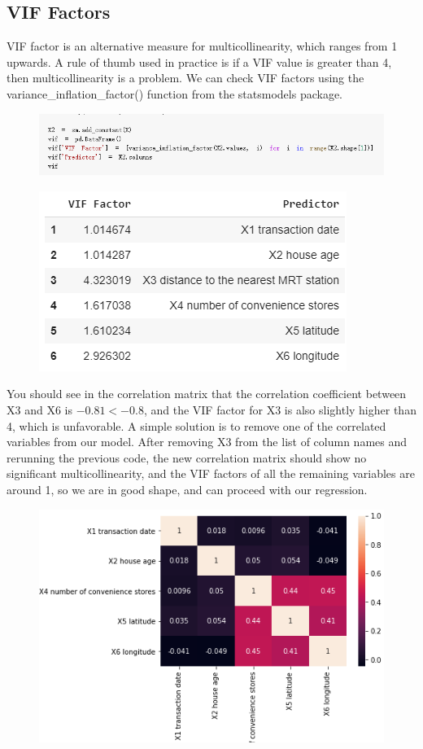 \documentclass{article}
\begin{document}
\subsection*{VIF Factors}
VIF factor is an alternative measure for multicollinearity, which ranges from 1 upwards. A rule of thumb used in practice is if a VIF value is greater than 4, then multicollinearity is a problem. We can check VIF factors using the variance\_inflation\_factor() function from the statsmodels package.
\begin{figure}[H]\includegraphics[width=\linewidth]{10}\end{figure}
\begin{figure}[H]\centering\includegraphics[width=0.5\linewidth]{11}\end{figure}
You should see in the correlation matrix that the correlation coefficient between X3 and X6 is $-0.81 < -0.8$, and the VIF factor for X3 is also slightly higher than 4, which is unfavorable. A simple solution is to remove one of the correlated variables from our model. After removing X3 from the list of column names and rerunning the previous code, the new correlation matrix should show no significant multicollinearity, and the VIF factors of all the remaining variables are around 1, so we are in good shape, and can proceed with our regression.
\begin{figure}[H]\includegraphics[width=0.8\linewidth]{12}\end{figure}
\end{document}
